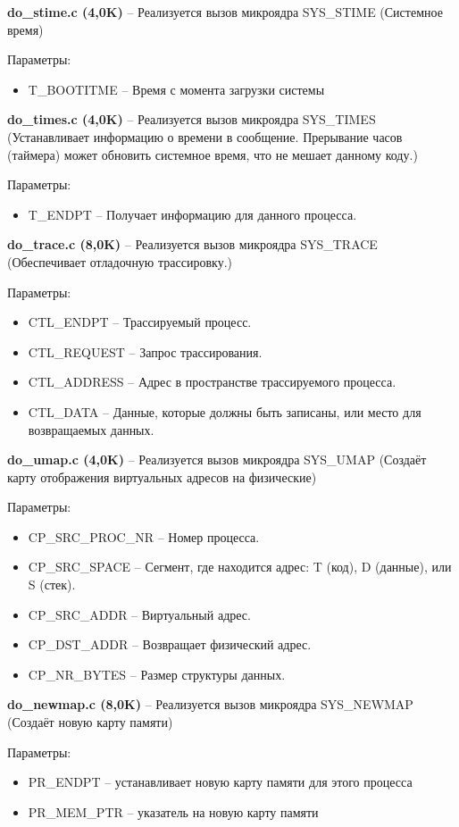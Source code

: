\textbf{do\_stime.c (4,0K)} -- Реализуется вызов микроядра SYS\_STIME (Системное время)

Параметры:
\begin{itemize}
\item T\_BOOTITME -- Время с момента загрузки системы
\end{itemize}

\textbf{do\_times.c (4,0K)} -- Реализуется вызов микроядра SYS\_TIMES (Устанавливает информацию о времени в сообщение. Прерывание часов (таймера) может обновить системное время, что не мешает данному коду.)

Параметры:
\begin{itemize}
\item T\_ENDPT -- Получает информацию для данного процесса.
\end{itemize}

\textbf{do\_trace.c (8,0K)} -- Реализуется вызов микроядра SYS\_TRACE (Обеспечивает отладочную трассировку.)

Параметры:
\begin{itemize}
\item CTL\_ENDPT -- Трассируемый процесс.
\item CTL\_REQUEST -- Запрос трассирования.
\item CTL\_ADDRESS -- Адрес в пространстве трассируемого процесса.
\item CTL\_DATA -- Данные, которые должны быть записаны, или место для возвращаемых данных.
\end{itemize}

\textbf{do\_umap.c (4,0K)} -- Реализуется вызов микроядра SYS\_UMAP (Создаёт карту отображения виртуальных адресов на физические)

Параметры:
\begin{itemize}
\item CP\_SRC\_PROC\_NR -- Номер процесса.
\item CP\_SRC\_SPACE -- Сегмент, где находится адрес: T (код), D (данные), или S (стек).
\item CP\_SRC\_ADDR -- Виртуальный адрес.
\item CP\_DST\_ADDR -- Возвращает физический адрес.
\item CP\_NR\_BYTES -- Размер структуры данных.
\end{itemize}

\textbf{do\_newmap.c (8,0K)} -- Реализуется вызов микроядра SYS\_NEWMAP (Создаёт новую карту памяти)

Параметры:
\begin{itemize}
\item PR\_ENDPT -- устанавливает новую карту памяти для этого процесса
\item PR\_MEM\_PTR -- указатель на новую карту памяти
\end{itemize}

